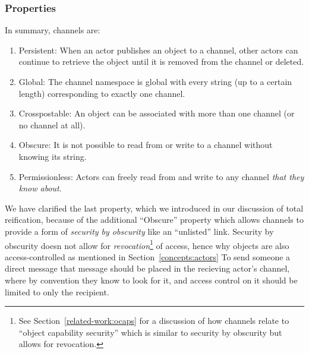 





\subsubsection{Properties}

In summary, channels are:

\begin{enumerate}
\item
Persistent: When an actor publishes an object to a channel, other actors can
continue to retrieve the object until it is removed from the channel or deleted.
\item
Global: The channel namespace is global with every string (up to a certain length)
corresponding to exactly one channel.
\item
Crosspostable: An object can be associated with more than one channel (or no channel at all).
\item
Obscure: It is not possible to read from or write to a channel without knowing
its string.
\item
Permissionless: Actors can freely read from and write to any channel \emph{that they know about}.
\end{enumerate}

We have clarified the last property, which we introduced in our discussion of
total reification, because of the additional ``Obscure'' property
which allows channels to provide a form of \emph{security by obscurity} like an ``unlisted'' link.
Security by obscurity doesn not allow for \emph{revocation}\footnote{
    See Section~\ref{related-work:ocaps} for a discussion of how channels relate to ``object capability security''
    which is similar to security by obscurity but allows for revocation.
}
of access,
hence why objects are also access-controlled as mentioned in Section~\ref{concepts:actors}
To send someone a direct message that message should be placed in
the recieving actor's channel, where by convention they know to look for it,
and access control on it should be limited to only the recipient.

